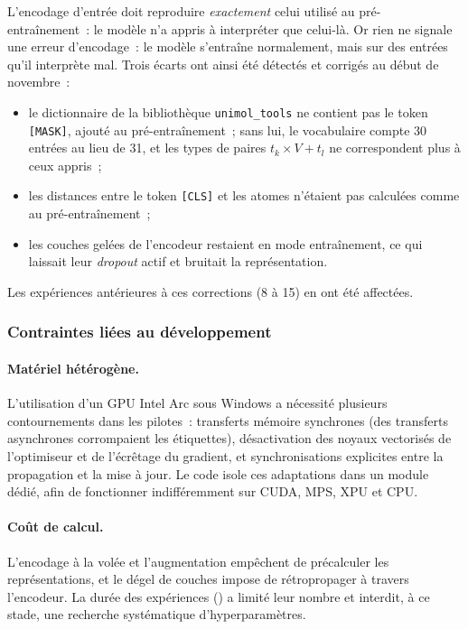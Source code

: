 L'encodage d'entrée doit reproduire \emph{exactement} celui utilisé au pré-entraînement~: le modèle n'a appris à interpréter que celui-là.
Or rien ne signale une erreur d'encodage~: le modèle s'entraîne normalement, mais sur des entrées qu'il interprète mal.
Trois écarts ont ainsi été détectés et corrigés au début de novembre~:
\begin{itemize}
   \item le dictionnaire de la bibliothèque \texttt{unimol\_\allowbreak tools} ne contient pas le token \texttt{[MASK]}, ajouté au pré-entraînement~; sans lui, le vocabulaire compte 30 entrées au lieu de 31, et les types de paires $t_k \times V + t_l$ ne correspondent plus à ceux appris~;
   \item les distances entre le token \texttt{[CLS]} et les atomes n'étaient pas calculées comme au pré-entraînement~;
   \item les couches gelées de l'encodeur restaient en mode entraînement, ce qui laissait leur \emph{dropout} actif et bruitait la représentation.
\end{itemize}
Les expériences antérieures à ces corrections (8 à 15) en ont été affectées.

\subsubsection{Contraintes liées au développement}

\paragraph{Matériel hétérogène.}
L'utilisation d'un GPU Intel Arc sous Windows a nécessité plusieurs contournements dans les pilotes~: transferts mémoire synchrones (des transferts asynchrones corrompaient les étiquettes), désactivation des noyaux vectorisés de l'optimiseur et de l'écrêtage du gradient, et synchronisations explicites entre la propagation et la mise à jour.
Le code isole ces adaptations dans un module dédié, afin de fonctionner indifféremment sur CUDA, MPS, XPU et CPU.

\paragraph{Coût de calcul.}
L'encodage à la volée et l'augmentation empêchent de précalculer les représentations, et le dégel de couches impose de rétropropager à travers l'encodeur.
La durée des expériences () a limité leur nombre et interdit, à ce stade, une recherche systématique d'hyperparamètres.

